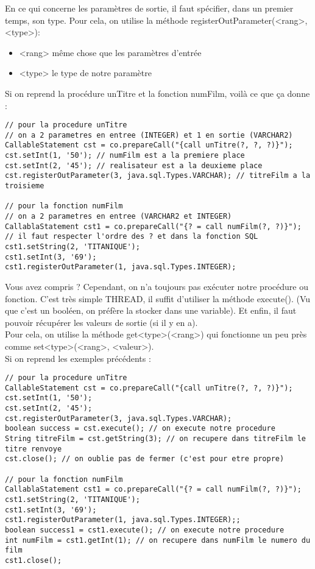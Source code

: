 \documentclass{report}
\begin{document}
En ce qui concerne les paramètres de sortie, il faut spécifier, dans un premier temps, son type. Pour cela, on utilise la méthode registerOutParameter(<rang>, <type>):
\begin{itemize}
\item <rang> même chose que les paramètres d'entrée
\item <type> le type de notre paramètre
\end{itemize}

Si on reprend la procédure unTitre et la fonction numFilm, voilà ce que ça donne :
\begin{lstlisting}[style=MyJavaStyle]
// pour la procedure unTitre
// on a 2 parametres en entree (INTEGER) et 1 en sortie (VARCHAR2)
CallableStatement cst = co.prepareCall("{call unTitre(?, ?, ?)}");
cst.setInt(1, '50'); // numFilm est a la premiere place
cst.setInt(2, '45'); // realisateur est a la deuxieme place  
cst.registerOutParameter(3, java.sql.Types.VARCHAR); // titreFilm a la troisieme

// pour la fonction numFilm
// on a 2 parametres en entree (VARCHAR2 et INTEGER)
CallablaStatement cst1 = co.prepareCall("{? = call numFilm(?, ?)}");
// il faut respecter l'ordre des ? et dans la fonction SQL
cst1.setString(2, 'TITANIQUE'); 
cst1.setInt(3, '69');
cst1.registerOutParameter(1, java.sql.Types.INTEGER);
\end{lstlisting}
Vous avez compris ? Cependant, on n'a toujours pas exécuter notre procédure ou fonction. C'est très simple THREAD, il suffit d'utiliser la méthode execute().
(Vu que c'est un booléen, on préfère la stocker dans une variable).
Et enfin, il faut pouvoir récupérer les valeurs de sortie (si il y en a).\\
Pour cela, on utilise la méthode get<type>(<rang>) qui fonctionne un peu près comme set<type>(<rang>, <valeur>).\\
Si on reprend les exemples précédents :
\begin{lstlisting}[style=MyJavaStyle]
// pour la procedure unTitre
CallableStatement cst = co.prepareCall("{call unTitre(?, ?, ?)}");
cst.setInt(1, '50');
cst.setInt(2, '45');
cst.registerOutParameter(3, java.sql.Types.VARCHAR);
boolean success = cst.execute(); // on execute notre procedure
String titreFilm = cst.getString(3); // on recupere dans titreFilm le titre renvoye
cst.close(); // on oublie pas de fermer (c'est pour etre propre)

// pour la fonction numFilm
CallablaStatement cst1 = co.prepareCall("{? = call numFilm(?, ?)}");
cst1.setString(2, 'TITANIQUE'); 
cst1.setInt(3, '69');
cst1.registerOutParameter(1, java.sql.Types.INTEGER);;
boolean success1 = cst1.execute(); // on execute notre procedure
int numFilm = cst1.getInt(1); // on recupere dans numFilm le numero du film
cst1.close(); 
\end{lstlisting}
\end{document}
